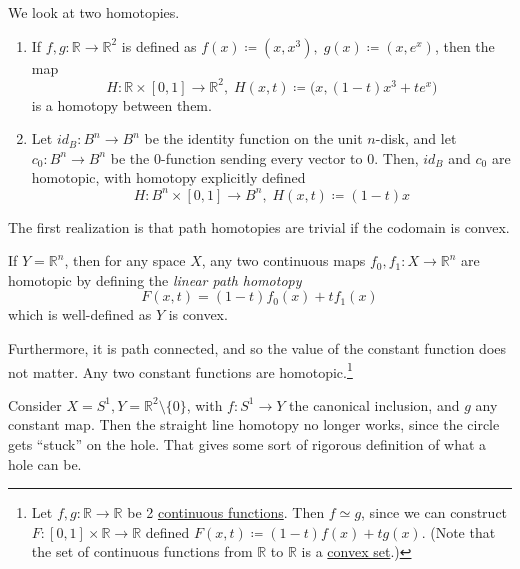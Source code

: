 	\begin{example}
	  \label{ex:simple-homotopies}
		We look at two homotopies. 
		\begin{enumerate}
		  \item If $f, g: \mathbb{R} \to \mathbb{R}^2$ is defined as $f(x) \coloneqq (x, x^3), \; g(x) \coloneqq (x, e^x)$, then the map 
				\begin{equation}
					H: \mathbb{R} \times [0,1] \to \mathbb{R}^2, \; H(x, t) \coloneqq \big( x, (1-t) x^3 + t e^x \big)
				\end{equation}
				is a homotopy between them. 

			\item Let $id_B: B^n \to B^n$ be the identity function on the unit $n$-disk, and let $c_0: B^n \to B^n$ be the $0$-function sending every vector to $0$. Then, $id_B$ and $c_0$ are homotopic, with homotopy explicitly defined
				\begin{equation}
					H: B^n \times [0,1] \to B^n, \; H(x, t) \coloneqq (1-t) x
				\end{equation}
		\end{enumerate}
  \end{example}

	The first realization is that path homotopies are trivial if the codomain is convex. 

  \begin{example}
    \label{ex:homotopy-on-convex-spaces}
    If $Y = \mathbb{R}^n$, then for any space $X$, any two continuous maps $f_0, f_1: X \to \mathbb{R}^n$ are homotopic by defining the \textit{linear path homotopy}
    \begin{equation}
      F(x, t) = (1 - t) f_0 (x) + t f_1 (x) 
    \end{equation}
    which is well-defined as $Y$ is convex. 

		Furthermore, it is path connected, and so the value of the constant function does not matter. Any two constant functions are homotopic.\footnote{Let $f, g: \mathbb{R} \to \mathbb{R}$ be 2 \hyperref[pst-def:continuous_func]{continuous functions}. Then $f \simeq g$, since we can construct $F: [0,1] \times \mathbb{R} \to \mathbb{R}$ defined $F(x, t) \coloneqq (1-t) f(x) + t g(x)$. (Note that the set of continuous functions from $\mathbb{R}$ to $\mathbb{R}$ is a \hyperref[alg-def:convex-set]{convex set}.)}
  \end{example}

  \begin{example}
    \label{ex:two-non-homotopic-functions}
    Consider $X = S^1, Y = \mathbb{R}^2 \setminus \{0\}$, with $f: S^1 \to Y$ the canonical inclusion, and $g$ any constant map. Then the straight line homotopy no longer works, since the circle gets ``stuck'' on the hole. That gives some sort of rigorous definition of what a hole can be. 
  \end{example}

